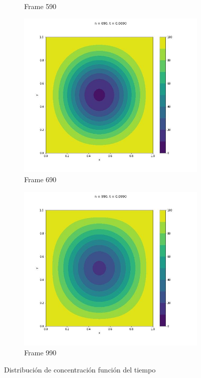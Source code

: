 \documentclass{article}
\begin{document}
\begin{figure} [H]
\begin{subfigure}{0.25\linewidth}
    \caption{Frame 590}
  \end{subfigure}
      \begin{subfigure}{0.25\linewidth}
    \centering
    \includegraphics[width=\linewidth]{Polar/2D/690.jpg}
    \caption{Frame 690}
  \end{subfigure}
      \begin{subfigure}{0.3\linewidth}
    \centering
    \includegraphics[width=\linewidth]{Polar/2D/990.jpg}
    \caption{Frame 990}
  \end{subfigure}
  \caption{Distribución de concentración función del tiempo}
  \label{fig:polar2d}
\end{figure}
\end{document}
